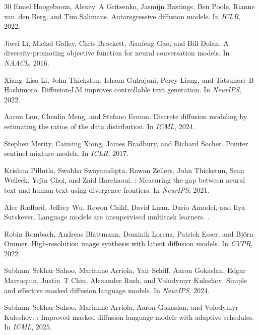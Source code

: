 \documentclass{article}
\begin{document}
\begin{thebibliography}{30}
Emiel Hoogeboom, Alexey~A Gritsenko, Jasmijn Bastings, Ben Poole, Rianne van~den Berg, and Tim Salimans.
\newblock Autoregressive diffusion models.
\newblock In \emph{ICLR}, 2022.

Jiwei Li, Michel Galley, Chris Brockett, Jianfeng Gao, and Bill Dolan.
\newblock A diversity-promoting objective function for neural conversation models.
\newblock In \emph{NAACL}, 2016.

Xiang~Lisa Li, John Thickstun, Ishaan Gulrajani, Percy Liang, and Tatsunori~B Hashimoto.
\newblock Diffusion-{LM} improves controllable text generation.
\newblock In \emph{NeurIPS}, 2022.

Aaron Lou, Chenlin Meng, and Stefano Ermon.
\newblock Discrete diffusion modeling by estimating the ratios of the data distribution.
\newblock In \emph{ICML}, 2024.

Stephen Merity, Caiming Xiong, James Bradbury, and Richard Socher.
\newblock Pointer sentinel mixture models.
\newblock In \emph{ICLR}, 2017.

Krishna Pillutla, Swabha Swayamdipta, Rowan Zellers, John Thickstun, Sean Welleck, Yejin Choi, and Zaid Harchaoui.
: Measuring the gap between neural text and human text using divergence frontiers.
\newblock In \emph{NeurIPS}, 2021.

Alec Radford, Jeffrey Wu, Rewon Child, David Luan, Dario Amodei, and Ilya Sutskever.
\newblock Language models are unsupervised multitask learners.
.

Robin Rombach, Andreas Blattmann, Dominik Lorenz, Patrick Esser, and Bj{\"o}rn Ommer.
\newblock High-resolution image synthesis with latent diffusion models.
\newblock In \emph{CVPR}, 2022.

Subham~Sekhar Sahoo, Marianne Arriola, Yair Schiff, Aaron Gokaslan, Edgar Marroquin, Justin~T Chiu, Alexander Rush, and Volodymyr Kuleshov.
\newblock Simple and effective masked diffusion language models.
\newblock In \emph{NeurIPS}, 2024.

Subham~Sekhar Sahoo, Marianne Arriola, Aaron Gokaslan, and Volodymyr Kuleshov.
: Improved masked diffusion language models with adaptive schedules.
\newblock In \emph{ICML}, 2025.


\end{thebibliography}
\end{document}
